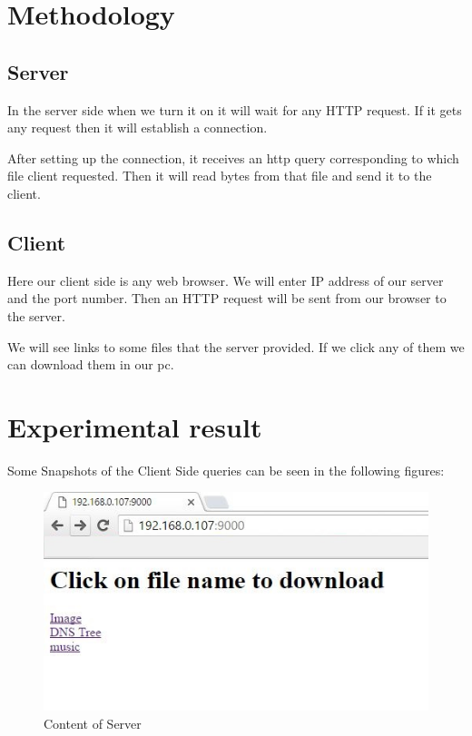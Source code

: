 \documentclass[11pt]{article}
\begin{document}
\section{Methodology}

\subsection{Server}
In the server side when we turn it on it will wait for any HTTP request. If it
gets any request then it will establish a connection.

After setting up the connection, it receives an http query corresponding to which file client requested. Then it will
read bytes from that file and send it to the client.

\subsection{Client}
Here our client side is any web browser. We will enter IP address of our server and the port number. Then an HTTP request will be sent from our browser to the server. 

We will see links to some files that the server provided. If we click any of them we can download them in our pc.

\section{Experimental result}

Some Snapshots of the Client Side queries can be seen in the following figures: 
\begin{figure}[!h]
\centering
\includegraphics[width=\textwidth]{Request.JPG}
\caption{Content of Server}
\end{figure}
\end{document}
